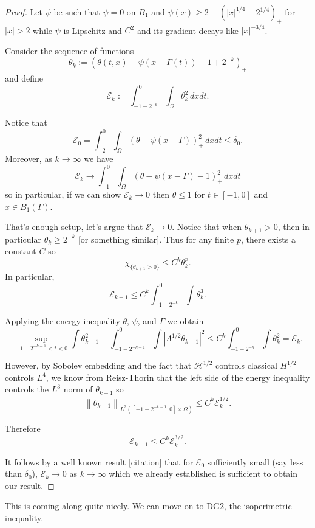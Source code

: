 \documentclass[11pt]{amsart}
\theoremstyle{remark}
\theoremstyle{definition}
\newcommand{\E}{\mathcal{E}}
\newcommand{\norm}[1]{\left\lVert#1\right\rVert}
\newcommand{\paren}[1]{\left( #1 \right)}
\newcommand{\abs}[1]{\left\lvert #1 \right\rvert}
\newcommand{\indic}[1]{\chi_{\{#1\}}}
\newcommand{\HD}{\mathcal{H}}
\begin{document}
\begin{proof}
Let $\psi$ be such that $\psi = 0$ on $B_1$ and $\psi(x) \geq 2 + \paren{|x|^{1/4}-2^{1/4}}_+$ for $|x|>2$ while $\psi$ is Lipschitz and $C^2$ and its gradient decays like $|x|^{-3/4}$.  

Consider the sequence of functions
\[ \theta_k := (\theta(t,x) - \psi(x - \Gamma(t)) - 1 + 2^{-k})_+ \]
and define
\[ \E_k := \int_{-1-2^{-k}}^0 \int_\Omega \theta_k^2 \,dxdt. \]

Notice that
\[ \E_0 = \int_{-2}^0 \int_\Omega (\theta - \psi(x-\Gamma))_+^2 \,dxdt \leq \delta_0. \]
Moreover, as $k \to \infty$ we have
\[ \E_k \to \int_{-1}^0 \int_\Omega (\theta - \psi(x-\Gamma) - 1)_+^2 \,dxdt \]
so in particular, if we can show $\E_k \to 0$ then $\theta \leq 1$ for $t \in [-1,0]$ and $x \in B_1(\Gamma)$.  

That's enough setup, let's argue that $\E_k \to 0$.  Notice that when $\theta_{k+1}>0$, then in particular $\theta_k \geq 2^{-k}$ [or something similar].  Thus for any finite $p$, there exists a constant $C$ so
\[ \indic{\theta_{k+1}>0} \leq C^k \theta_k^p. \]
In particular,
\[ \E_{k+1} \leq C^k \int_{-1-2^{-k}}^0 \int \theta_k^3. \]

Applying the energy inequality $\theta$, $\psi$, and $\Gamma$ we obtain
\[ \sup_{-1-2^{-k-1}<t<0} \int \theta_{k+1}^2 + \int_{-1-2^{-k-1}}^0 \int \abs{\Lambda^{1/2}\theta_{k+1}}^2 \leq C^k \int_{-1-2^{-k}}^0 \int \theta_k^2 = \E_k. \]

However, by Sobolev embedding and the fact that $\HD^{1/2}$ controls classical $H^{1/2}$ controls $L^4$, we know from Reisz-Thorin that the left side of the energy inequality controls the $L^3$ norm of $\theta_{k+1}$ so
\[ \norm{\theta_{k+1}}_{L^3([-1-2^{-k-1},0]\times\Omega)} \leq C^k \E_k^{1/2}. \]

Therefore
\[ \E_{k+1} \leq C^k \E_k^{3/2}. \]

It follows by a well known result [citation] that for $\E_0$ sufficiently small (say less than $\delta_0$), $\E_k \to 0$ as $k \to \infty$ which we already established is sufficient to obtain our result.  
\end{proof}


This is coming along quite nicely.  We can move on to DG2, the isoperimetric inequality.  
\end{document}
